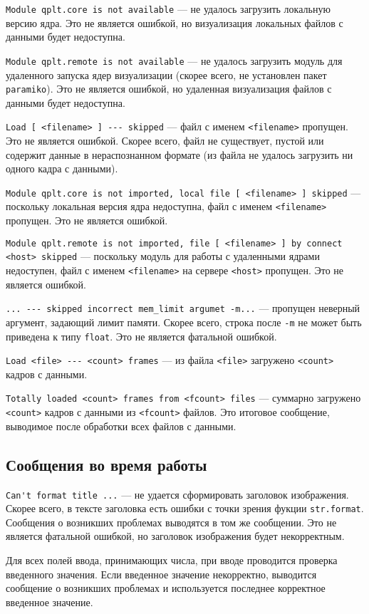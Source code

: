 \documentclass[12pt]{article}
\begin{document}
\verb'Module qplt.core is not available' --- не удалось загрузить локальную версию ядра. Это не является ошибкой, но визуализация локальных файлов с данными будет недоступна.

\verb'Module qplt.remote is not available' --- не удалось загрузить модуль для удаленного запуска ядер визуализации (скорее всего, не установлен пакет \verb'paramiko').
Это не является ошибкой, но удаленная визуализация файлов с данными будет недоступна.

\verb'Load [ <filename> ] --- skipped' --- файл с именем \verb'<filename>' пропущен. Это не является ошибкой.
Скорее всего, файл не существует, пустой или содержит данные в нераспознанном формате (из файла не удалось загрузить ни одного кадра с данными). 

\verb'Module qplt.core is not imported, local file [ <filename> ] skipped' --- поскольку локальная версия ядра недоступна,
файл с именем \verb'<filename>' пропущен. Это не является ошибкой.

\verb'Module qplt.remote is not imported, file [ <filename> ] by connect <host> skipped' --- поскольку модуль для работы с удаленными ядрами недоступен,
файл с именем \verb'<filename>'  на сервере \verb'<host>' пропущен. Это не является ошибкой.

\verb'... --- skipped incorrect mem_limit argumet -m...' --- пропущен неверный аргумент, задающий лимит памяти. Скорее всего, строка после \verb'-m'
не может быть приведена к типу \verb'float'. Это не является фатальной ошибкой.

\verb'Load <file> --- <count> frames' --- из файла \verb'<file>' загружено \verb'<count>' кадров с данными.

\verb'Totally loaded <count> frames from <fcount> files' --- суммарно загружено \verb'<count>' кадров с данными из \verb'<fcount>' файлов. Это итоговое сообщение,
выводимое после обработки всех файлов с данными.

\subsection{Сообщения во время работы}
\verb|Can't format title ...| --- не удается сформировать заголовок изображения. Скорее всего, в тексте заголовка есть ошибки с точки зрения фукции \verb'str.format'.
Сообщения о возникших проблемах выводятся в том же сообщении. Это не является фатальной ошибкой, но заголовок изображения будет некорректным.

Для всех полей ввода, принимающих числа, при вводе проводится проверка введенного значения. Если введенное значение некорректно, выводится сообщение
о возникших проблемах и используется последнее корректное введенное значение.
\end{document}
